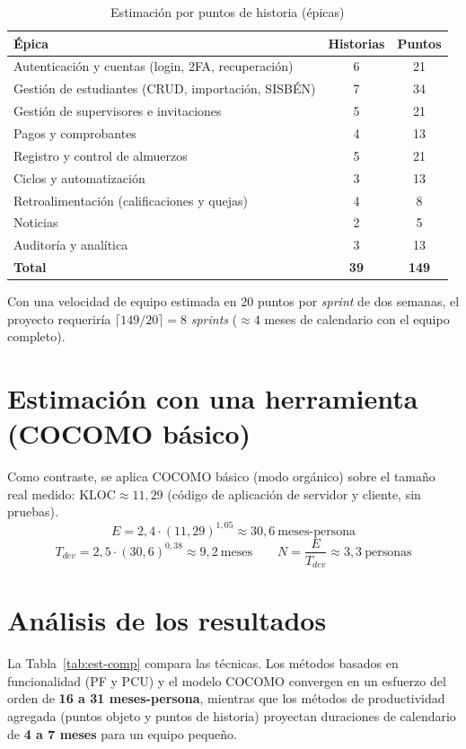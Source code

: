 \begin{table}[H]\centering
\caption{Estimación por puntos de historia (épicas)}\label{tab:ph}
\begin{tabularx}{\textwidth}{X c c}
\toprule
\textbf{Épica} & \textbf{Historias} & \textbf{Puntos} \\
\midrule
Autenticación y cuentas (login, 2FA, recuperación) & 6 & 21 \\
Gestión de estudiantes (CRUD, importación, SISBÉN) & 7 & 34 \\
Gestión de supervisores e invitaciones & 5 & 21 \\
Pagos y comprobantes & 4 & 13 \\
Registro y control de almuerzos & 5 & 21 \\
Ciclos y automatización & 3 & 13 \\
Retroalimentación (calificaciones y quejas) & 4 & 8 \\
Noticias & 2 & 5 \\
Auditoría y analítica & 3 & 13 \\
\midrule
\textbf{Total} & \textbf{39} & \textbf{149} \\
\bottomrule
\end{tabularx}
\end{table}

Con una velocidad de equipo estimada en 20 puntos por \emph{sprint} de dos semanas, el
proyecto requeriría $\lceil 149/20 \rceil = 8$ \emph{sprints} ($\approx 4$ meses de
calendario con el equipo completo).

\section{Estimación con una herramienta (COCOMO básico)}
Como contraste, se aplica COCOMO básico (modo orgánico) sobre el tamaño real medido:
$\text{KLOC} \approx 11{,}29$ (código de aplicación de servidor y cliente, sin pruebas).
\[
E = 2{,}4 \cdot (11{,}29)^{1{,}05} \approx 30{,}6\ \text{meses-persona}
\]
\[
T_{dev} = 2{,}5 \cdot (30{,}6)^{0{,}38} \approx 9{,}2\ \text{meses}
\qquad
N = \frac{E}{T_{dev}} \approx 3{,}3\ \text{personas}
\]

\section{Análisis de los resultados}
La Tabla~\ref{tab:est-comp} compara las técnicas. Los métodos basados en
funcionalidad (PF y PCU) y el modelo COCOMO convergen en un esfuerzo del orden de
\textbf{16 a 31 meses-persona}, mientras que los métodos de productividad agregada
(puntos objeto y puntos de historia) proyectan duraciones de calendario de
\textbf{4 a 7 meses} para un equipo pequeño.


